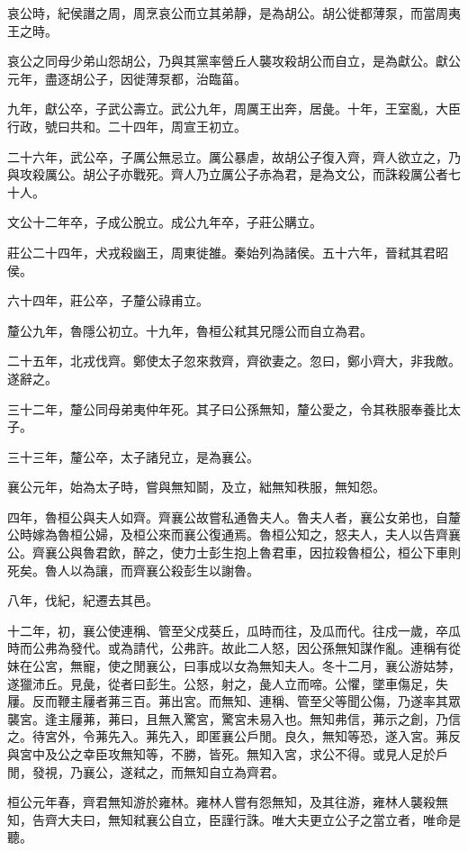 哀公時，紀侯譖之周，周烹哀公而立其弟靜，是為胡公。胡公徙都薄泵，而當周夷王之時。

哀公之同母少弟山怨胡公，乃與其黨率營丘人襲攻殺胡公而自立，是為獻公。獻公元年，盡逐胡公子，因徙薄泵都，治臨菑。

九年，獻公卒，子武公壽立。武公九年，周厲王出奔，居彘。十年，王室亂，大臣行政，號曰共和。二十四年，周宣王初立。

二十六年，武公卒，子厲公無忌立。厲公暴虐，故胡公子復入齊，齊人欲立之，乃與攻殺厲公。胡公子亦戰死。齊人乃立厲公子赤為君，是為文公，而誅殺厲公者七十人。

文公十二年卒，子成公脫立。成公九年卒，子莊公購立。

莊公二十四年，犬戎殺幽王，周東徙雒。秦始列為諸侯。五十六年，晉弒其君昭侯。

六十四年，莊公卒，子釐公祿甫立。

釐公九年，魯隱公初立。十九年，魯桓公弒其兄隱公而自立為君。

二十五年，北戎伐齊。鄭使太子忽來救齊，齊欲妻之。忽曰，鄭小齊大，非我敵。遂辭之。

三十二年，釐公同母弟夷仲年死。其子曰公孫無知，釐公愛之，令其秩服奉養比太子。

三十三年，釐公卒，太子諸兒立，是為襄公。

襄公元年，始為太子時，嘗與無知鬬，及立，絀無知秩服，無知怨。

四年，魯桓公與夫人如齊。齊襄公故嘗私通魯夫人。魯夫人者，襄公女弟也，自釐公時嫁為魯桓公婦，及桓公來而襄公復通焉。魯桓公知之，怒夫人，夫人以告齊襄公。齊襄公與魯君飲，醉之，使力士彭生抱上魯君車，因拉殺魯桓公，桓公下車則死矣。魯人以為讓，而齊襄公殺彭生以謝魯。

八年，伐紀，紀遷去其邑。

十二年，初，襄公使連稱、管至父戍葵丘，瓜時而往，及瓜而代。往戍一歲，卒瓜時而公弗為發代。或為請代，公弗許。故此二人怒，因公孫無知謀作亂。連稱有從妹在公宮，無寵，使之閒襄公，曰事成以女為無知夫人。冬十二月，襄公游姑棼，遂獵沛丘。見彘，從者曰彭生。公怒，射之，彘人立而啼。公懼，墜車傷足，失屨。反而鞭主屨者茀三百。茀出宮。而無知、連稱、管至父等聞公傷，乃遂率其眾襲宮。逢主屨茀，茀曰，且無入驚宮，驚宮未易入也。無知弗信，茀示之創，乃信之。待宮外，令茀先入。茀先入，即匿襄公戶閒。良久，無知等恐，遂入宮。茀反與宮中及公之幸臣攻無知等，不勝，皆死。無知入宮，求公不得。或見人足於戶閒，發視，乃襄公，遂弒之，而無知自立為齊君。

桓公元年春，齊君無知游於雍林。雍林人嘗有怨無知，及其往游，雍林人襲殺無知，告齊大夫曰，無知弒襄公自立，臣謹行誅。唯大夫更立公子之當立者，唯命是聽。

